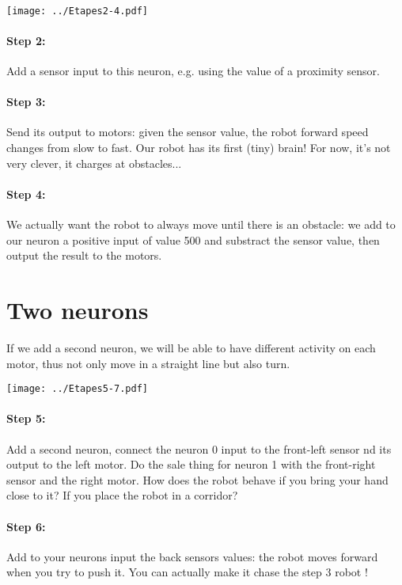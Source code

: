 \documentclass[12pt]{article}
\begin{document}
~\\
\begin{center}
\texttt{[image: ../Etapes2-4.pdf]}
\end{center}

\paragraph{Step 2:} Add a sensor input to this neuron, e.g. using the value of a proximity sensor.

\paragraph{Step 3:} Send its output to motors: given the sensor value, the robot forward speed changes from slow to fast. Our robot has its first (tiny) brain! For now, it's not very clever, it charges at obstacles...

\paragraph{Step 4:} We actually want the robot to always move until there is an obstacle: we add to our neuron a positive input of value 500 and substract the sensor value, then output the result to the motors.

\section{Two neurons}

If we add a second neuron, we will be able to have different activity on each motor, thus not only move in a straight line but also turn.

\begin{center}
\texttt{[image: ../Etapes5-7.pdf]}
\end{center}

\paragraph{Step 5:} Add a second neuron, connect the neuron 0 input to the front-left sensor nd its output to the left motor. Do the sale thing for neuron 1 with the front-right sensor and the right motor. How does the robot behave if you bring your hand close to it? If you place the robot in a corridor?

\paragraph{Step 6:} Add to your neurons input the back sensors values: the robot moves forward when you try to push it. You can actually make it chase the step 3 robot !
\end{document}
